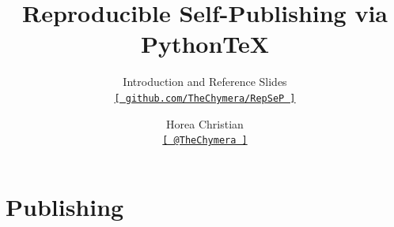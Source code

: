 

\title[Reproducible Self-Publishing via Python\TeX\ --- Introduction and Reference Slides]{Reproducible Self-Publishing via Python\TeX}
\subtitle{Introduction and Reference Slides\\\href{https://github.com/TheChymera/RepSeP}{\small\texttt{[ github.com/TheChymera/RepSeP ]}}}
\author[Horea Christian]{Horea Christian\\\href{https://twitter.com/TheChymera}{\small\texttt{[ @TheChymera ]}}}

	\begin{frame}
		\titlepage
	\end{frame}
	\section{Publishing}
